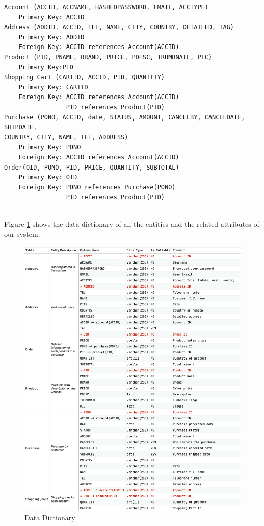 \documentclass{article}
\begin{document}
\begin{verbatim}
Account (ACCID, ACCNAME, HASHEDPASSWORD, EMAIL, ACCTYPE)
    Primary Key: ACCID
Address (ADDID, ACCID, TEL, NAME, CITY, COUNTRY, DETAILED, TAG)
    Primary Key: ADDID
    Foreign Key: ACCID references Account(ACCID)
Product (PID, PNAME, BRAND, PRICE, PDESC, TRUMBNAIL, PIC)
    Primary Key:PID
Shopping Cart (CARTID, ACCID, PID, QUANTITY)
    Primary Key: CARTID
    Foreign Key: ACCID references Account(ACCID)
                 PID references Product(PID)
Purchase (PONO, ACCID, date, STATUS, AMOUNT, CANCELBY, CANCELDATE, SHIPDATE, 
COUNTRY, CITY, NAME, TEL, ADDRESS)
    Primary Key: PONO
    Foreign Key: ACCID references Account(ACCID)
Order(OID, PONO, PID, PRICE, QUANTITY, SUBTOTAL)
    Primary Key: OID
    Foreign Key: PONO references Purchase(PONO)
                 PID references Product(PID)
                 
\end{verbatim}Figure \ref{fig:Data Dictionary} shows the data dictionary of all the entities and the related attributes of our system.
\begin{figure}[!htp]
    \centering
    \includegraphics[width=1\textwidth]{Data Dictionary.png}
    \caption{\label{fig:Data Dictionary}Data Dictionary}
\end{figure}
\end{document}
